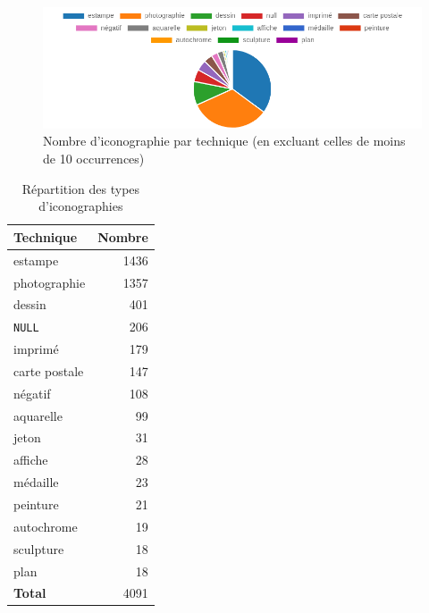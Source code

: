 \begin{figure}[h!]
    \centering
    \includegraphics[width=1\linewidth]{images/graphiques/nb_icono_technique>10.png}
    \caption{Nombre d'iconographie par technique (en excluant celles de moins de 10 occurrences)}         \label{fig:nb_icono_technique}
\end{figure}

\begin{table}[h!]
    \centering
    \begin{tabular}{|l|r|}
        \toprule
        \textbf{Technique} & \textbf{Nombre} \\ \hline
        estampe        & 1436 \\ 
        photographie   & 1357 \\ 
        dessin         & 401  \\ 
        \texttt{NULL}  & 206  \\ 
        imprimé        & 179  \\ 
        carte postale  & 147  \\ 
        négatif        & 108  \\
        aquarelle      & 99   \\
        jeton          & 31   \\
        affiche        & 28   \\
        médaille       & 23   \\
        peinture       & 21   \\
        autochrome     & 19   \\
        sculpture      & 18   \\
        plan           & 18   \\ 
        \midrule
        \textbf{Total} & 4091 \\
        \bottomrule
    \end{tabular}
    \caption{Répartition des types d'iconographies}
    \label{tab:repartition_iconographies}
\end{table}

\newpage
